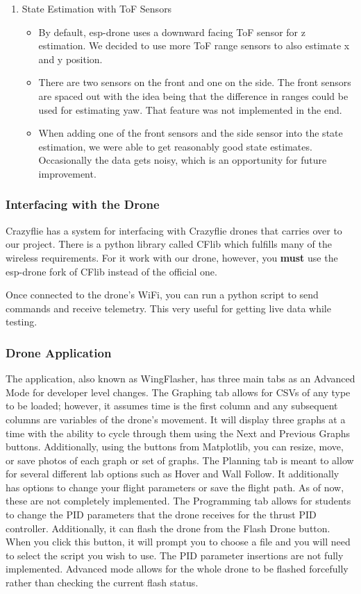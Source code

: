 \documentclass[12pt, titlepage]{article}
\begin{document}
\begin{enumerate}
\begin{itemize}
    \end{itemize}
  \item State Estimation with ToF Sensors
    \begin{itemize}
      \item By default, esp-drone uses a downward facing ToF sensor for z estimation. We decided to use more ToF range sensors to also estimate x and y position. 
      \item There are two sensors on the front and one on the side. The front sensors are spaced out with the idea being that the difference in ranges could be used for estimating yaw. That feature was not implemented in the end. 
      \item When adding one of the front sensors and the side sensor into the state estimation, we were able to get reasonably good state estimates. Occasionally the data gets noisy, which is an opportunity for future improvement.
    \end{itemize}

\end{enumerate}

\subsubsection{Interfacing with the Drone}
Crazyflie has a system for interfacing with Crazyflie drones that carries over to our project. There is a python library called CFlib which fulfills many of the wireless requirements. For it work with our drone, however, you \textbf{must} use the esp-drone fork of CFlib instead of the official one.

Once connected to the drone's WiFi, you can run a python script to send commands and receive telemetry. This very useful for getting live data while testing.

\subsubsection{Drone Application}
The application, also known as WingFlasher, has three main tabs as an Advanced Mode for developer level changes. The Graphing tab allows for CSVs of any type to be loaded; however, it assumes time is the first column and any subsequent columns are variables of the drone’s movement. It will display three graphs at a time with the ability to cycle through them using the Next and Previous Graphs buttons. Additionally, using the buttons from Matplotlib, you can resize, move, or save photos of each graph or set of graphs. The Planning tab is meant to allow for several different lab options such as Hover and Wall Follow. It additionally has options to change your flight parameters or save the flight path. As of now, these are not completely implemented. The Programming tab allows for students to change the PID parameters that the drone receives for the thrust PID controller. Additionally, it can flash the drone from the Flash Drone button. When you click this button, it will prompt you to choose a file and you will need to select the script you wish to use. The PID parameter insertions are not fully implemented. Advanced mode allows for the whole drone to be flashed forcefully rather than checking the current flash status.
\end{document}
